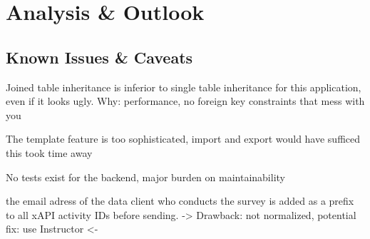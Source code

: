 \section{Analysis \& Outlook}
    \subsection{Known Issues \& Caveats}
        Joined table inheritance is inferior to single table inheritance
        for this application, even if it looks ugly. Why: performance,
        no foreign key constraints that mess with you

        The template feature is too sophisticated, import and export would have sufficed
        this took time away

        No tests exist for the backend, major burden on maintainability

         the email adress of the data client who conducts the survey
    is added as a prefix to all xAPI activity IDs before sending.
    -> Drawback: not normalized, potential fix: use Instructor <-